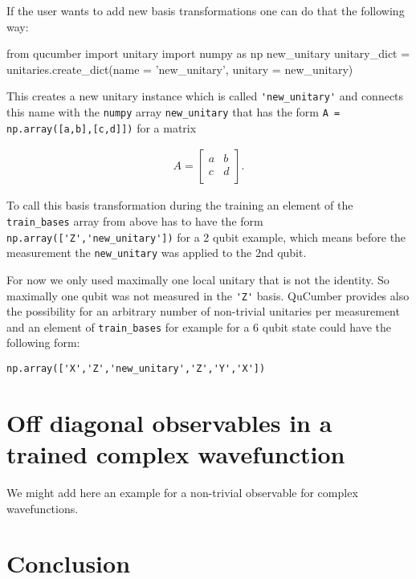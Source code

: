\documentclass[submission, Phys]{SciPost}
\begin{document}
If the user wants to add new basis transformations one can do that the following way:

\begin{python}
from qucumber import unitary
import numpy as np
new_unitary
unitary_dict = unitaries.create_dict(name = 'new_unitary', unitary = new_unitary)
\end{python}

This creates a new unitary instance which is called \verb|'new_unitary'| and connects this name with the \verb|numpy| array 
\verb|new_unitary| that has the form \verb|A = np.array([a,b],[c,d]])| for a matrix 

\begin{align}
A = 
\begin{bmatrix}
a &b \\
c &d \\ 
\end{bmatrix}.
\end{align} 

To call this basis transformation during the training an element of the \verb|train_bases| array from above has to have the form 
\verb|np.array(['Z','new_unitary'])| for a 2 qubit example, which means before the measurement the \verb|new_unitary| was applied to the 2nd qubit.

For now we only used maximally one local unitary that is not the identity. So maximally one qubit was not measured in the \verb|'Z'| basis. QuCumber provides also the possibility for an arbitrary number of non-trivial unitaries per measurement and an element of  \verb|train_bases| for example for a 6 qubit state could have the following form:

\verb|np.array(['X','Z','new_unitary','Z','Y','X'])|

\section{Off diagonal observables in a trained complex wavefunction}

We might add here an example for a non-trivial observable for complex wavefunctions.

\section{Conclusion}
\end{document}
